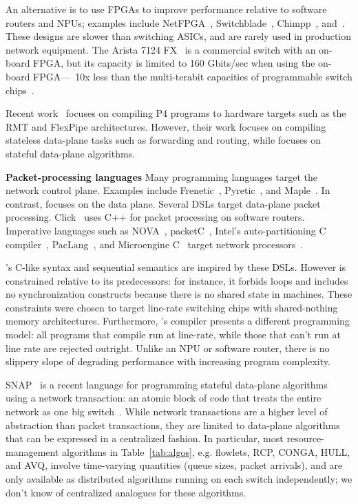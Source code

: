 An alternative is to use FPGAs to improve performance relative to software
routers and NPUs; examples include NetFPGA~\cite{netfpga},
Switchblade~\cite{switchblade}, Chimpp~\cite{chimpp}, and~\cite{silver_bullet}.
These designs are slower than switching ASICs, and are rarely used in
production network equipment. The Arista 7124 FX~\cite{7124fx} is a commercial
switch with an on-board FPGA, but its capacity is limited to 160 Gbits/sec when
using the on-board FPGA---~10x less than the multi-terabit capacities of
programmable switch chips~\cite{xpliant}.

Recent work~\cite{lavanya_compiler} focuses on compiling P4 programs to
hardware targets such as the RMT and FlexPipe architectures. However, their
work focuses on compiling stateless data-plane tasks such as forwarding and
routing, while \pktlanguage focuses on stateful data-plane algorithms.

\textbf{Packet-processing languages}
Many programming languages target the network control plane. Examples include
Frenetic~\cite{frenetic}, Pyretic~\cite{pyretic}, and Maple~\cite{maple}. In
contrast, \pktlanguage focuses on the data plane. Several DSLs target
data-plane packet processing. Click~\cite{click} uses C++ for packet processing
on software routers. Imperative languages such as NOVA~\cite{nova},
packetC~\cite{packetc}, Intel's auto-partitioning C
compiler~\cite{intel_uiuc_pldi}, PacLang~\cite{paclang_lang,
paclang_partitioner}, and Microengine C~\cite{microenginec, intel_ixa} target
network processors~\cite{ixp2800, ixp4xx}.

\pktlanguage's C-like syntax and sequential semantics are inspired by these
DSLs. However \pktlanguage is constrained relative to its predecessors: for
instance, it forbids loops and includes no synchronization constructs because
there is no shared state in \absmachine machines. These constraints were chosen
to target line-rate switching chips with shared-nothing memory architectures.
Furthermore, \pktlanguage's compiler presents a different programming model:
all \pktlanguage programs that compile run at line-rate, while those that can't
run at line rate are rejected outright. Unlike an NPU or software router, there
is no slippery slope of degrading performance with increasing program
complexity.

SNAP~\cite{snap} is a recent language for programming stateful data-plane
algorithms using a network transaction: an atomic block of code that treats the
entire network as one big switch~\cite{onebigswitch}. While network
transactions are a higher level of abstraction than packet transactions, they
are limited to data-plane algorithms that can be expressed in a centralized
fashion. In particular, most resource-management algorithms in
Table~\ref{tab:algos}, e.g. flowlets, RCP, CONGA, HULL, and AVQ, involve
time-varying quantities (queue sizes, packet arrivals), and are only available
as distributed algorithms running on each switch independently; we don't know
of centralized analogues for these algorithms.

